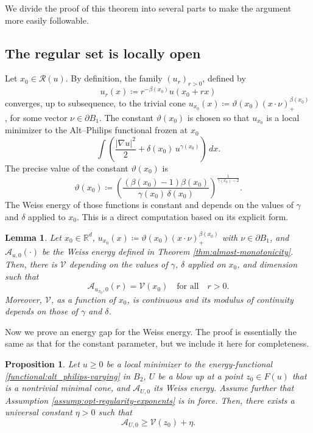 \documentclass[reqno,11pt]{amsart}
\newtheorem{lemma}{Lemma}[section]
\newtheorem{proposition}{Proposition}[section]
\newcommand{\1}{\mathds{1}}  %
\numberwithin{equation}{section}
\begin{document}
We divide the proof of this theorem into several parts to make the argument more easily followable.

\subsection{The regular set is locally open}

Let $x_0 \in \mathcal{R}(u)$. By definition, the family $(u_r)_{r>0}$, defined by
\[
    u_r(x) \coloneqq r^{-\beta(x_0)}u(x_0 + rx)
\]
converges, up to subsequence, to the trivial cone $u_{x_0}(x) \coloneqq \vartheta(x_0)(x \cdot \nu)_+^{\beta(x_0)}$, for some vector $\nu \in \partial B_1$. The constant $\vartheta(x_0)$ is chosen so that $u_{x_0}$ is a local minimizer to the Alt--Philips functional frozen at $x_0$
\[
    \int \left( \frac{|\nabla u|^2}{2} + \delta(x_0)\,u^{\gamma(x_0)} \right)\,dx.
\]
The precise value of the constant $\vartheta(x_0)$ is
\[
	\vartheta(x_0) \coloneqq \left(\frac{(\beta(x_0)-1)\beta(x_0)}{\gamma(x_0)\, \delta(x_0)}\right)^{\frac{1}{\gamma(x_0)-2}}.
\]
The Weiss energy of those functions is constant and depends on the values of $\gamma$ and $\delta$ applied to $x_0$. This is a direct computation based on its explicit form.

\begin{lemma}\label{lemma: weiss energy of trivial}
Let $x_0 \in \mathbb{R}^d$, $u_{x_0}(x) \coloneqq \vartheta(x_0)(x \cdot \nu)_+^{\beta(x_0)}$ with $\nu \in \partial B_1$, and $\mathcal{A}_{u,0}(\cdot)$ be the Weiss energy defined in Theorem \ref{thm:almost-monotonicity}. Then, there is $\mathcal{V}$ depending on the values of $\gamma$, $\delta$ applied on $x_0$, and dimension such that
\[
    \mathcal{A}_{u_{x_0},0}(r) = \mathcal{V}(x_0) \quad \text{for all} \quad r>0.
\]
Moreover, $\mathcal{V}$, as a function of $x_0$, is continuous and its modulus of continuity depends on those of $\gamma$ and $\delta$.
\end{lemma}

Now we prove an energy gap for the Weiss energy. The proof is essentially the same as that for the constant parameter, but we include it here for completeness.

\begin{proposition}\label{prop:energy-gap}
Let $u \geq 0$ be a local minimizer to the energy-functional \eqref{functional:alt_philips-varying} in $B_2$, $U$ be a blow up at a point $z_0 \in F(u)$ that is a nontrivial minimal cone, and $\mathcal{A}_{U,0}$ its Weiss energy. Assume further that Assumption \eqref{assump:opt-regularity-exponents} is in force. Then, there exists a universal constant $\eta>0$ such that
\begin{equation}\label{eq:gap-at-0}
    \mathcal{A}_{U,0}\ge \mathcal{V}(z_0)+\eta.
\end{equation}
\end{proposition}
\end{document}
